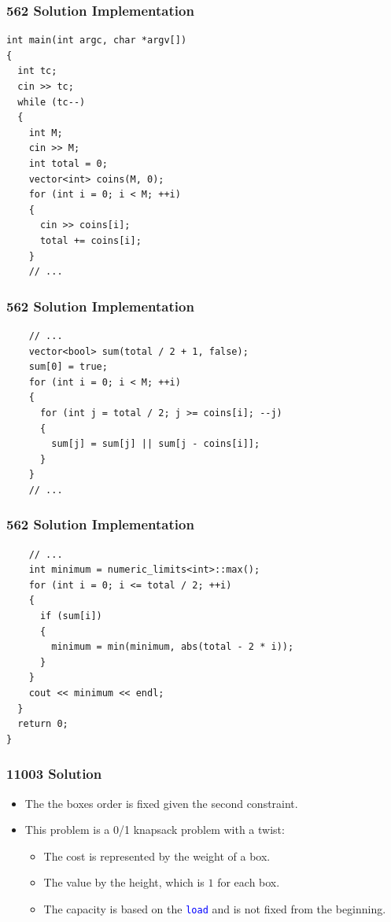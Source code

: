\documentclass{beamer}
\begin{document}
\begin{frame}[containsverbatim]
\frametitle{562 Solution Implementation}
\scriptsize

\begin{lstlisting}
int main(int argc, char *argv[])
{
  int tc;
  cin >> tc;
  while (tc--)
  {
    int M;
    cin >> M;
    int total = 0;
    vector<int> coins(M, 0);
    for (int i = 0; i < M; ++i)
    {
      cin >> coins[i];
      total += coins[i];
    }
    // ...
\end{lstlisting}

\end{frame}

\begin{frame}[containsverbatim]
\frametitle{562 Solution Implementation}
\scriptsize

\begin{lstlisting}
    // ...
    vector<bool> sum(total / 2 + 1, false);
    sum[0] = true;
    for (int i = 0; i < M; ++i)
    {
      for (int j = total / 2; j >= coins[i]; --j)
      {
        sum[j] = sum[j] || sum[j - coins[i]];
      }
    }
    // ...
\end{lstlisting}

\end{frame}

\begin{frame}[containsverbatim]
\frametitle{562 Solution Implementation}
\scriptsize

\begin{lstlisting}
    // ...
    int minimum = numeric_limits<int>::max();
    for (int i = 0; i <= total / 2; ++i)
    {
      if (sum[i])
      {
        minimum = min(minimum, abs(total - 2 * i));
      }
    }
    cout << minimum << endl;
  }
  return 0;
}
\end{lstlisting}

\end{frame}

\begin{frame}%
\frametitle{11003 Solution}

\begin{itemize}

\item The the boxes order is fixed given the second constraint.

\vspace{0.25cm}

\item<2-> This problem is a 0/1 knapsack problem with a twist:

\begin{itemize}
\item<2-> The cost is represented by the weight of a box.
\vspace{0.15cm}
\item<3-> The value by the height, which is $1$ for each box.
\vspace{0.15cm}
\item<4-> The capacity is based on the \textcolor{blue}{\texttt{load}} and is not fixed from the beginning.
\end{itemize}
\end{itemize}

\end{frame}
\end{document}
